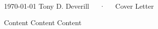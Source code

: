 \documentclass[11pt, a4paper]{awesome-cv}
\begin{document}
\makecvheader[R]

\makecvfooter
  {\today}
  {Tony D. Deverill~~~·~~~Cover Letter}
  {}

\makelettertitle

\begin{cvletter}

Content
Content
Content
\end{cvletter}


\makeletterclosing
\end{document}
